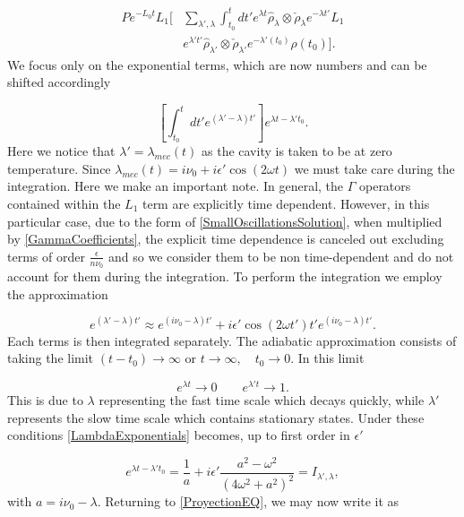 \documentclass[reprint, amsmath,amssymb, aps,pra]{revtex4-1}
\begin{document}
\begin{align}\label{ProyectionEQ}
P e^{-L_0 t}L_1[&\sum_{\lambda',\lambda}\int_{t_0}^{t}dt'e^{\lambda t} \hat{\rho}_{\lambda} \otimes \check{\rho}_{\lambda}e^{-\lambda t'}L_1\\
&e^{\lambda' t'}\hat{\rho}_{\lambda'} \otimes \check{\rho}_{\lambda'} e^{-\lambda'( t_0)}\rho(t_0)]\nonumber.
\end{align} We focus only on the exponential terms, which are now numbers and can be shifted accordingly

\begin{equation}\label{LambdaExponentials}
[\int_{t_0}^t dt' e^{(\lambda'-\lambda)t'}]e^{\lambda t- \lambda't_0}.
\end{equation} Here we notice that $\lambda' = \lambda_{mec}(t)$ as the cavity is taken to be at zero temperature. Since $\lambda_{mec}(t) = i\nu_0 + i\epsilon' \cos(2\omega t)$ we must take care during the integration. Here we make an important note. In general, the $\Gamma$ operators contained within the $L_1$ term are explicitly time dependent. However, in this particular case, due to the form of \eqref{SmallOscillationsSolution}, when multiplied by \eqref{GammaCoefficients}, the explicit time dependence is canceled out excluding terms of order $\frac{\epsilon}{n\nu_0}$ and so we consider them to be non time-dependent and do not account for them during the integration. To perform the integration we employ the approximation

\begin{equation}
e^{(\lambda'-\lambda)t'} \approx e^{(i\nu_0-\lambda)t'} + i\epsilon' \cos(2 \omega t')t' e^{(i\nu_0-\lambda)t'}.
\end{equation} Each terms is then integrated separately. The adiabatic approximation consists of taking the limit $(t-t_0) \to \infty$ or $t \to \infty, \quad t_0 \to 0$. In this limit

\begin{equation}
e^{\lambda t} \to 0 \qquad e^{\lambda' t} \to 1.
\end{equation} This is due to $\lambda$ representing the fast time scale which decays quickly, while $\lambda'$ represents the slow time scale which contains stationary states. Under these conditions \eqref{LambdaExponentials} becomes, up to first order in $\epsilon'$

\begin{equation}
[\int_{t_0}^t dt' e^{(\lambda'-\lambda)t'}]e^{\lambda t- \lambda't_0} = \frac{1}{a} + i\epsilon' \frac{a^2 - \omega^2}{(4\omega^2 + a^2)^2} = I_{\lambda',\lambda},
\end{equation} with $a = i\nu_0 - \lambda$. Returning to \eqref{ProyectionEQ}, we may now write it as
\end{document}
